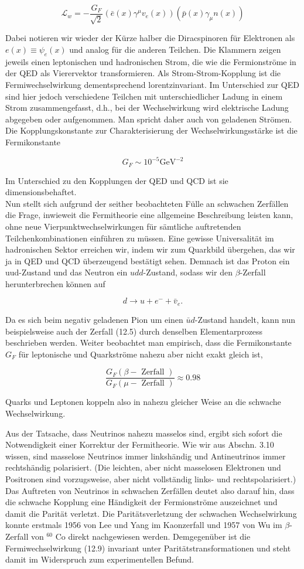 \documentclass[10pt, letterpaper]{article}
\begin{document}
$$
\mathscr{L}_{w}=-\frac{G_{F}}{\sqrt{2}}\left(\bar{e}(x) \gamma^{\mu} v_{e}(x)\right)\left(\bar{p}(x) \gamma_{\mu} n(x)\right)
$$

Dabei notieren wir wieder der Kürze halber die Diracspinoren für Elektronen als $e(x) \equiv \psi_{e}(x)$ und analog für die anderen Teilchen. Die Klammern zeigen jeweils einen leptonischen und hadronischen Strom, die wie die Fermionströme in der QED als Vierervektor transformieren. Als Strom-Strom-Kopplung ist die Fermiwechselwirkung dementsprechend lorentzinvariant. Im Unterschied zur QED sind hier jedoch verschiedene Teilchen mit unterschiedlicher Ladung in einem Strom zusammengefasst, d.h., bei der Wechselwirkung wird elektrische Ladung abgegeben oder aufgenommen. Man spricht daher auch von geladenen Strömen. Die Kopplungskonstante zur Charakterisierung der Wechselwirkungsstärke ist die Fermikonstante

$$
G_{F} \sim 10^{-5} \mathrm{GeV}^{-2}
$$

Im Unterschied zu den Kopplungen der QED und QCD ist sie dimensionsbehaftet.\\
Nun stellt sich aufgrund der seither beobachteten Fülle an schwachen Zerfällen die Frage, inwieweit die Fermitheorie eine allgemeine Beschreibung leisten kann, ohne neue Vierpunktwechselwirkungen für sämtliche auftretenden Teilchenkombinationen einführen zu müssen. Eine gewisse Universalität im hadronischen Sektor erreichen wir, indem wir zum Quarkbild übergehen, das wir ja in QED und QCD überzeugend bestätigt sehen. Demnach ist das Proton ein uud-Zustand und das Neutron ein $u d d$-Zustand, sodass wir den $\beta$-Zerfall herunterbrechen können auf

$$
d \rightarrow u+e^{-}+\bar{v}_{e} .
$$

Da es sich beim negativ geladenen Pion um einen $\bar{u} d$-Zustand handelt, kann nun beispielsweise auch der Zerfall (12.5) durch denselben Elementarprozess beschrieben werden. Weiter beobachtet man empirisch, dass die Fermikonstante $G_{F}$ für leptonische und Quarkströme nahezu aber nicht exakt gleich ist,

$$
\frac{G_{F}(\beta-\text { Zerfall })}{G_{F}(\mu-\text { Zerfall })} \approx 0.98
$$

Quarks und Leptonen koppeln also in nahezu gleicher Weise an die schwache Wechselwirkung.

Aus der Tatsache, dass Neutrinos nahezu masselos sind, ergibt sich sofort die Notwendigkeit einer Korrektur der Fermitheorie. Wie wir aus Abschn. 3.10 wissen, sind masselose Neutrinos immer linkshändig und Antineutrinos immer rechtshändig polarisiert. (Die leichten, aber nicht masselosen Elektronen und Positronen sind vorzugsweise, aber nicht vollständig links- und rechtspolarisiert.) Das Auftreten von Neutrinos in schwachen Zerfällen deutet also darauf hin, dass die schwache Kopplung eine Händigkeit der Fermionströme auszeichnet und damit die Parität verletzt. Die Paritätsverletzung der schwachen Wechselwirkung konnte erstmals 1956 von Lee und Yang im Kaonzerfall und 1957 von Wu im $\beta$-Zerfall von ${ }^{60}$ Co direkt nachgewiesen werden. Demgegenüber ist die Fermiwechselwirkung (12.9) invariant unter Paritätstransformationen und steht damit im Widerspruch zum experimentellen Befund.
\end{document}
